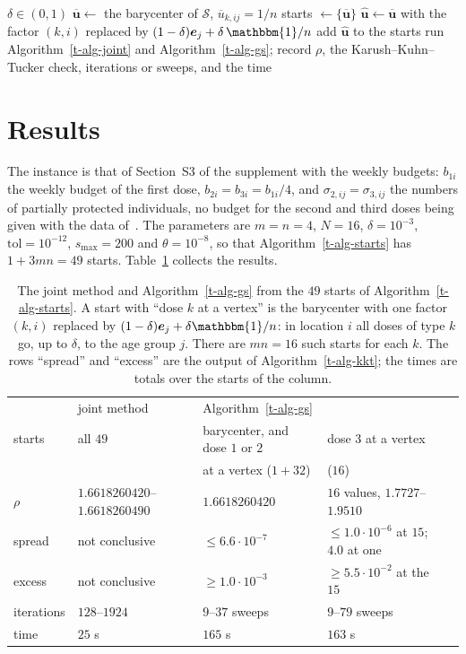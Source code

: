 \documentclass[11pt]{article}
\theoremstyle{plain}
\theoremstyle{remark}
\numberwithin{equation}{section}
\begin{document}
\begin{algorithm}[ht]
\caption{The comparison over starts}\label{t-alg-starts}
\begin{algorithmic}[1]
\Require $\delta\in(0,1)$
\State $\overline{\bm u}\gets$ the barycenter of $\mathcal{S}$, $\overline u_{k,ij}=1/n$
\State starts $\gets\{\overline{\bm u}\}$
  \State $\widehat{\bm u}\gets\overline{\bm u}$ with the factor $(k,i)$ replaced by
  $(1-\delta)\bm e_j+\delta\,\mathbbm{1}/n$
  \State add $\widehat{\bm u}$ to the starts
\EndFor
{}
  \State run Algorithm~\ref{t-alg-joint} and Algorithm~\ref{t-alg-gs}; record $\rho$, the
  Karush--Kuhn--Tucker check, iterations or sweeps, and the time
\EndFor
\end{algorithmic}
\end{algorithm}

\section{Results}\label{t-results}

The instance is that of Section~S3 of the supplement with the weekly budgets:
$b_{1i}$ the weekly budget of the first dose, $b_{2i}=b_{3i}=b_{1i}/4$, and
$\sigma_{2,ij}=\sigma_{3,ij}$ the numbers of partially protected individuals,
no budget for the second and third doses being given with the data
of~\cite{JZh}. The parameters are $m=n=4$, $N=16$, $\delta=10^{-3}$,
$\mathrm{tol}=10^{-12}$, $s_{\max}=200$ and $\theta=10^{-8}$, so that
Algorithm~\ref{t-alg-starts} has $1+3mn=49$ starts. Table~\ref{t-tab} collects
the results.

\begin{table}[ht]
\centering
\small
\begin{tabular}{lllll}
\hline
 & joint method & \multicolumn{2}{l}{Algorithm~\ref{t-alg-gs}}\\
starts & all $49$ & barycenter, and dose $1$ or $2$ & dose $3$ at a vertex\\
 & & at a vertex ($1+32$) & ($16$)\\
\hline
$\rho$ & $1.6618260420$--$1.6618260490$ & $1.6618260420$ & $16$ values, $1.7727$--$1.9510$\\
spread & not conclusive & $\le 6.6\cdot 10^{-7}$ & $\le 1.0\cdot 10^{-6}$ at $15$; $4.0$ at one\\
excess & not conclusive & $\ge 1.0\cdot 10^{-3}$ & $\ge 5.5\cdot 10^{-2}$ at the $15$\\
iterations & $128$--$1924$ & $9$--$37$ sweeps & $9$--$79$ sweeps\\
time & $25$ s & $165$ s & $163$ s\\
\hline
\end{tabular}
\caption{The joint method and Algorithm~\ref{t-alg-gs} from the $49$ starts of
Algorithm~\ref{t-alg-starts}. A start with ``dose $k$ at a vertex'' is the
barycenter with one factor $(k,i)$ replaced by $(1-\delta)\bm e_j+\delta\mathbbm{1}/n$:
in location $i$ all doses of type $k$ go, up to $\delta$, to the age group $j$.
There are $mn=16$ such starts for each $k$. The rows ``spread'' and ``excess'' are the output
of Algorithm~\ref{t-alg-kkt}; the times are totals over the starts of the
column.}\label{t-tab}
\end{table}
\end{document}
